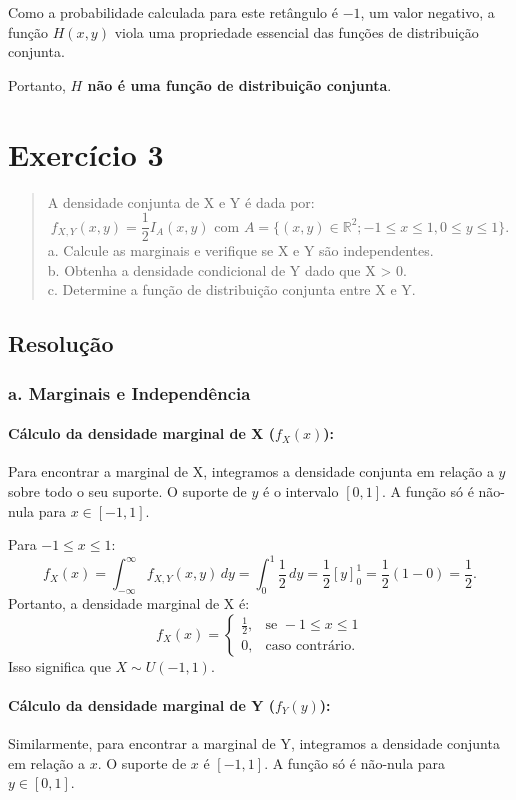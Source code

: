 \documentclass[12pt]{article}
\begin{document}
Como a probabilidade calculada para este retângulo é $-1$, um valor negativo, a função $H(x,y)$ viola uma propriedade essencial das funções de distribuição conjunta.

Portanto, \textbf{$H$ não é uma função de distribuição conjunta}. \hfill \qedsymbol

\section{Exercício 3}

\begin{quote}
A densidade conjunta de X e Y é dada por:
\[ f_{X,Y}(x,y) = \frac{1}{2} I_A(x,y) \text{ com } A = \{(x,y) \in \mathbb{R}^2; -1 \le x \le 1, 0 \le y \le 1\}. \]
a. Calcule as marginais e verifique se X e Y são independentes. \\
b. Obtenha a densidade condicional de Y dado que X > 0. \\
c. Determine a função de distribuição conjunta entre X e Y.
\end{quote}

\subsection*{Resolução}

\subsubsection*{a. Marginais e Independência}

\paragraph{Cálculo da densidade marginal de X ($f_X(x)$):}
Para encontrar a marginal de X, integramos a densidade conjunta em relação a $y$ sobre todo o seu suporte. O suporte de $y$ é o intervalo $[0, 1]$. A função só é não-nula para $x \in [-1, 1]$.

Para $-1 \le x \le 1$:
\[ f_X(x) = \int_{-\infty}^{\infty} f_{X,Y}(x,y) \,dy = \int_{0}^{1} \frac{1}{2} \,dy = \frac{1}{2} [y]_{0}^{1} = \frac{1}{2}(1-0) = \frac{1}{2}. \]
Portanto, a densidade marginal de X é:
\[ f_X(x) = \begin{cases} \frac{1}{2}, & \text{se } -1 \le x \le 1 \\ 0, & \text{caso contrário.} \end{cases} \]
Isso significa que $X \sim U(-1, 1)$.

\paragraph{Cálculo da densidade marginal de Y ($f_Y(y)$):}
Similarmente, para encontrar a marginal de Y, integramos a densidade conjunta em relação a $x$. O suporte de $x$ é $[-1, 1]$. A função só é não-nula para $y \in [0, 1]$.
\end{document}
